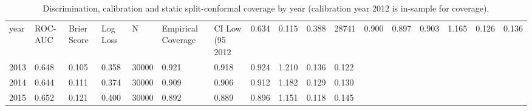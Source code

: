 \begin{table}[t]
\centering
\caption{Discrimination, calibration and static split-conformal coverage by year (calibration year 2012 is in-sample for coverage).}
\label{tab:t1_point_and_conformal_by_year}
\begin{tabular}{lllllllllll}
\toprule
year & ROC-AUC & Brier Score & Log Loss & N & Empirical Coverage & CI Low (95%
2012 & 0.634 & 0.115 & 0.388 & 28741 & 0.900 & 0.897 & 0.903 & 1.165 & 0.126 & 0.136 \\
2013 & 0.648 & 0.105 & 0.358 & 30000 & 0.921 & 0.918 & 0.924 & 1.210 & 0.136 & 0.122 \\
2014 & 0.644 & 0.111 & 0.374 & 30000 & 0.909 & 0.906 & 0.912 & 1.182 & 0.129 & 0.130 \\
2015 & 0.652 & 0.121 & 0.400 & 30000 & 0.892 & 0.889 & 0.896 & 1.151 & 0.118 & 0.145 \\
\bottomrule
\end{tabular}
\end{table}
